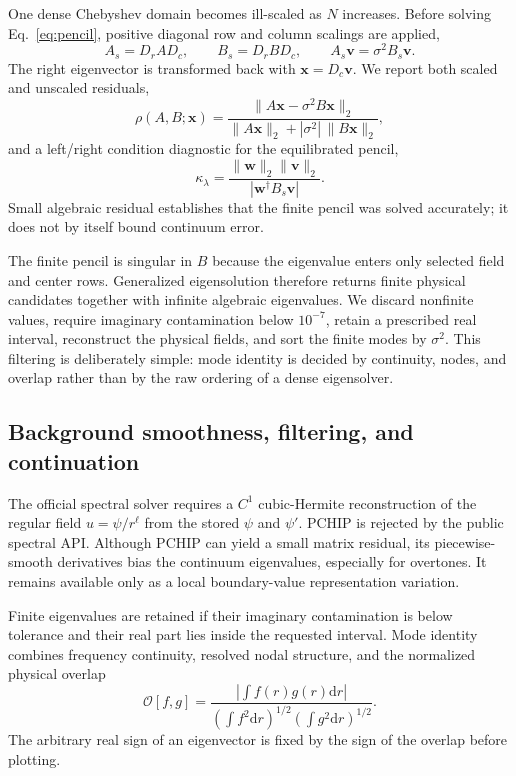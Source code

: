 \documentclass[aps,prd,preprint,onecolumn,nofootinbib,superscriptaddress,showkeys]{revtex4-2}
\newcommand{\dd}{\mathrm{d}}
\newcommand{\sigmatwo}{\sigma^{2}}
\begin{document}
One dense Chebyshev domain becomes ill-scaled as $N$ increases. Before solving Eq.~\eqref{eq:pencil}, positive diagonal row and column scalings are applied,
\begin{equation}
A_{s}=D_{r}AD_{c},
\qquad
B_{s}=D_{r}BD_{c},
\qquad
A_{s}\bm{v}=\sigmatwo B_{s}\bm{v}.
\end{equation}
The right eigenvector is transformed back with $\bm{x}=D_{c}\bm{v}$. We report both scaled and unscaled residuals,
\begin{equation}
\rho(A,B;\bm{x})=
\frac{\|A\bm{x}-\sigmatwo B\bm{x}\|_{2}}
{\|A\bm{x}\|_{2}+|\sigmatwo|\,\|B\bm{x}\|_{2}},
\label{eq:residual}
\end{equation}
and a left/right condition diagnostic for the equilibrated pencil,
\begin{equation}
\kappa_{\lambda}=\frac{\|\bm{w}\|_{2}\|\bm{v}\|_{2}}
{|\bm{w}^{\dagger}B_{s}\bm{v}|}.
\label{eq:condition}
\end{equation}
Small algebraic residual establishes that the finite pencil was solved accurately; it does not by itself bound continuum error.

The finite pencil is singular in $B$ because the eigenvalue enters only selected field and center rows. Generalized eigensolution therefore returns finite physical candidates together with infinite algebraic eigenvalues. We discard nonfinite values, require imaginary contamination below $10^{-7}$, retain a prescribed real interval, reconstruct the physical fields, and sort the finite modes by $\sigmatwo$. This filtering is deliberately simple: mode identity is decided by continuity, nodes, and overlap rather than by the raw ordering of a dense eigensolver.

\subsection{Background smoothness, filtering, and continuation}

The official spectral solver requires a $C^{1}$ cubic-Hermite reconstruction of the regular field $u=\psi/r^{\ell}$ from the stored $\psi$ and $\psi'$. PCHIP is rejected by the public spectral API. Although PCHIP can yield a small matrix residual, its piecewise-smooth derivatives bias the continuum eigenvalues, especially for overtones. It remains available only as a local boundary-value representation variation.

Finite eigenvalues are retained if their imaginary contamination is below tolerance and their real part lies inside the requested interval. Mode identity combines frequency continuity, resolved nodal structure, and the normalized physical overlap
\begin{equation}
\mathcal{O}[f,g]=
\frac{|\int f(r)g(r)\dd r|}
{\left(\int f^{2}\dd r\right)^{1/2}\left(\int g^{2}\dd r\right)^{1/2}}.
\end{equation}
The arbitrary real sign of an eigenvector is fixed by the sign of the overlap before plotting.
\end{document}
